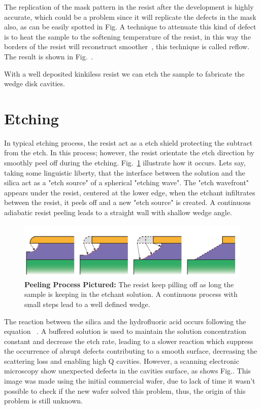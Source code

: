 The replication of the mask pattern in the resist after the development is highly accurate, which could be a problem since it will replicate the defects in the mask also, as can be easily spotted in Fig. A technique to attenuate this kind of defect is to heat the sample to the softening temperature of the resist, in this way the borders of the resist will reconstruct smoother~\cite{Ling11}, this technique is called reflow. The result is shown in Fig.~.

With a well deposited kinkiless resist we can etch the sample to fabricate the wedge disk cavities. 

\section{Etching}

In typical etching process, the resist act as a etch shield protecting the subtract from the etch. In this process; however, the resist orientate the etch direction by smoothly peel off during the etching. Fig.~\ref{fig:wedeg_grow} illustrate how it occurs. Lets say, taking some linguistic liberty, that the interface between the solution and the silica act as a "etch source" of a spherical "etching wave". The "etch wavefront" appears under the resist, centered at the lower edge, when the etchant infiltrates between the resist, it peels off and a new "etch source" is created. A continuous adiabatic resist peeling leads to a straight wall with shallow wedge angle. %

\begin{figure}[!ht]
    \centering
    \includegraphics[width = 16cm]{figuras/Dissertation_etching.jpg}
    \caption{\textbf{Peeling Process Pictured:} The resist keep pilling off as long the sample is keeping in the etchant solution. A continuous process with small steps lead to a well defined wedge.}
    \label{fig:wedeg_grow}
\end{figure}

The reaction between the silica and the hydrofluoric acid occurs following the equation~\cite{Kang_2002} 
.
A buffered solution is used to maintain the solution concentration constant and decrease the etch rate, leading to a slower reaction which suppress the occurrence of abrupt defects contributing to a smooth surface, decreasing the scattering loss and enabling high Q cavities. However, a scanning electronic microscopy show unexpected defects in the cavities surface, as shows Fig.. This image was made using the initial commercial wafer, due to lack of time it wasn't possible to check if the new wafer solved this problem, thus, the origin of this problem is still unknown. 

